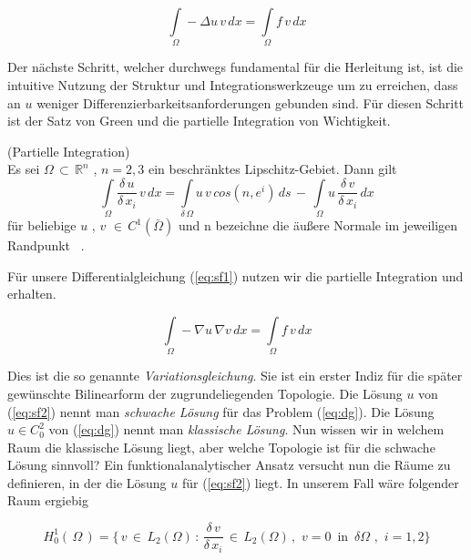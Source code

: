 \begin{equation}
\label{eq:sf1}
\int\limits_{\Omega} - \Delta u \, v  \, dx = \int\limits_{\Omega} f \, v  \, dx
\end{equation}

Der nächste Schritt, welcher durchwegs fundamental für die Herleitung ist, ist die intuitive Nutzung der Struktur und Integrationswerkzeuge um zu erreichen, dass an $u$ weniger Differenzierbarkeitsanforderungen gebunden sind. Für diesen Schritt ist der Satz von Green und die partielle Integration von Wichtigkeit.

\begin{Lemma} (Partielle Integration) \label{lemma:part} \\
Es sei $\Omega \, \subset \, \mathbb{R}^{n}$ , $n=2,3$ ein beschränktes Lipschitz-Gebiet. Dann gilt
\begin{equation*}
\int\limits_{\Omega} \dfrac{\delta \, u}{\delta \, x_i} \, v \, dx = \int\limits_{\delta \, \Omega} u \, v \, cos(n,e^i) \, ds \, - \, \int\limits_{\Omega} u \, \dfrac{\delta \, v}{\delta \, x_i} \, dx
\end{equation*}
für beliebige $u$ , $v$ $\in \, C^1(\bar{\Omega})$ und n bezeichne die äußere Normale im jeweiligen Randpunkt ~\cite[139]{Numerik}.
\end{Lemma}

Für unsere Differentialgleichung (\ref{eq:sf1}) nutzen wir die partielle Integration und erhalten.

\begin{equation} \label{eq:sf2}
\int\limits_{\Omega} - \nabla u \, \nabla v \, dx = \int\limits_{\Omega} f \, v \, dx
\end{equation}
  
Dies ist die so genannte \textit{Variationsgleichung}. Sie ist ein erster Indiz für die später gewünschte Bilinearform der zugrundeliegenden Topologie. 
Die Lösung $u$ von (\ref{eq:sf2}) nennt man \textit{schwache Lösung} für das Problem (\ref{eq:dg}).
Die Lösung $u \in C_{0}^{2}$ von (\ref{eq:dg}) nennt man \textit{klassische Lösung}. Nun wissen wir in welchem Raum die klassische Lösung liegt, aber welche Topologie ist für die schwache Lösung sinnvoll? 
Ein funktionalanalytischer Ansatz versucht nun die Räume zu definieren, in der die Lösung $u$ für (\ref{eq:sf2}) liegt. In unserem Fall wäre folgender Raum ergiebig

\begin{equation*}
	H_{0}^{1}(\, \Omega\, ) = \{ \, v \, \in \, L_{2}(\Omega) \, : \, \dfrac{\delta \, v}{\delta \, x_{i}}  \, \in \, L_{2}(\Omega) \, , \, \, v=0 \, \text{ in } \, \delta \Omega \text{ , } \,  i=1,2 \}
\end{equation*}

